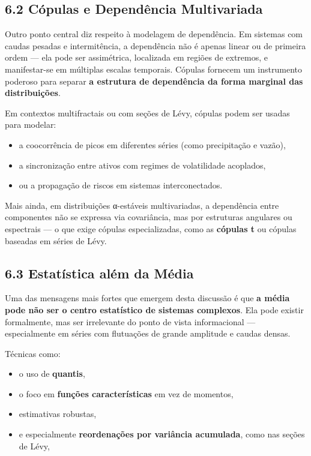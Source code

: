 \documentclass[
]{agujournal2019}
\providecommand{\tightlist}{%
  \setlength{\itemsep}{0pt}\setlength{\parskip}{0pt}}\usepackage{longtable,booktabs,array}
\begin{document}
\subsection{6.2 Cópulas e Dependência
Multivariada}\label{cuxf3pulas-e-dependuxeancia-multivariada}

Outro ponto central diz respeito à modelagem de dependência. Em sistemas
com caudas pesadas e intermitência, a dependência não é apenas linear ou
de primeira ordem --- ela pode ser assimétrica, localizada em regiões de
extremos, e manifestar-se em múltiplas escalas temporais. Cópulas
fornecem um instrumento poderoso para separar \textbf{a estrutura de
dependência da forma marginal das distribuições}.

Em contextos multifractais ou com seções de Lévy, cópulas podem ser
usadas para modelar:

\begin{itemize}
\tightlist
\item
  a coocorrência de picos em diferentes séries (como precipitação e
  vazão),
\item
  a sincronização entre ativos com regimes de volatilidade acoplados,
\item
  ou a propagação de riscos em sistemas interconectados.
\end{itemize}

Mais ainda, em distribuições α-estáveis multivariadas, a dependência
entre componentes não se expressa via covariância, mas por estruturas
angulares ou espectrais --- o que exige cópulas especializadas, como as
\textbf{cópulas t} ou cópulas baseadas em séries de Lévy.

\subsection{6.3 Estatística além da
Média}\label{estatuxedstica-aluxe9m-da-muxe9dia}

Uma das mensagens mais fortes que emergem desta discussão é que
\textbf{a média pode não ser o centro estatístico de sistemas
complexos}. Ela pode existir formalmente, mas ser irrelevante do ponto
de vista informacional --- especialmente em séries com flutuações de
grande amplitude e caudas densas.

Técnicas como:

\begin{itemize}
\tightlist
\item
  o uso de \textbf{quantis},
\item
  o foco em \textbf{funções características} em vez de momentos,
\item
  estimativas robustas,
\item
  e especialmente \textbf{reordenações por variância acumulada}, como
  nas seções de Lévy,
\end{itemize}
\end{document}
